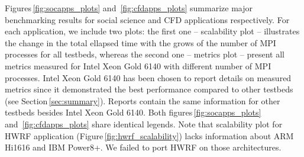 Figures\,\ref{fig:socapps_plots} and~\ref{fig:cfdapps_plots} summarize major benchmarking results
for social science and CFD applications respectively.
For each application, we include two plots:
the first one -- scalability plot -- illustrates the change
in the total ellapsed time with the grows of the number of MPI processes for all testbeds,
whereas the second one -- metrics plot -- present all metrics measured for Intel Xeon Gold 6140 with different number of MPI processes.
Intel Xeon Gold 6140 has been  chosen to report details on measured metrics 
since it demonstrated the best performance compared to other testbeds (see Section\,\ref{sec:summary}).
Reports \cite{2017:coegss_benchmark1,2018:coegss_benchmark2} contain the same information
for other testbeds besides Intel Xeon Gold 6140.
Both figures\,\ref{fig:socapps_plots} and~\ref{fig:cfdapps_plots} share identical legends.
Note that scalability plot for HWRF application (Figure\,\ref{fig:hwrf_scalability}) lacks information about ARM Hi1616 and IBM Power8+.
We failed to port HWRF on those architectures.




